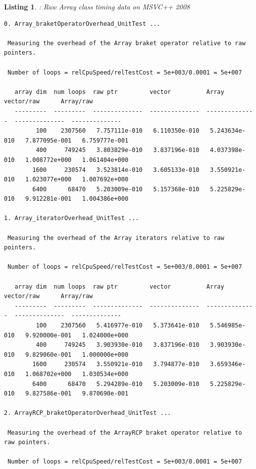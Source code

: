 \documentclass[pdf,ps2pdf,11pt]{SANDreport}
\newtheorem{listing}{Listing}
\begin{document}
\begin{listing}: Raw Array class timing data on MSVC++ 2008  \\
\label{listing:Array-MSVC-Timings}
{\scriptsize\begin{verbatim}
0. Array_braketOperatorOverhead_UnitTest ... 
 
 Measuring the overhead of the Array braket operator relative to raw pointers.
 
 Number of loops = relCpuSpeed/relTestCost = 5e+003/0.0001 = 5e+007
 
   array dim  num loops  raw ptr         vector          Array           vector/raw      Array/raw     
   ---------  ---------  --------------  --------------  --------------  --------------  --------------
         100    2307560   7.757111e-010   6.110350e-010   5.243634e-010   7.877095e-001   6.759777e-001
         400     749245   3.803829e-010   3.837196e-010   4.037398e-010   1.008772e+000   1.061404e+000
        1600     230574   3.523814e-010   3.605133e-010   3.550921e-010   1.023077e+000   1.007692e+000
        6400      68470   5.203009e-010   5.157368e-010   5.225829e-010   9.912281e-001   1.004386e+000

1. Array_iteratorOverhead_UnitTest ... 
 
 Measuring the overhead of the Array iterators relative to raw pointers.
 
 Number of loops = relCpuSpeed/relTestCost = 5e+003/0.0001 = 5e+007
 
   array dim  num loops  raw ptr         vector          Array           vector/raw      Array/raw     
   ---------  ---------  --------------  --------------  --------------  --------------  --------------
         100    2307560   5.416977e-010   5.373641e-010   5.546985e-010   9.920000e-001   1.024000e+000
         400     749245   3.903930e-010   3.837196e-010   3.903930e-010   9.829060e-001   1.000000e+000
        1600     230574   3.550921e-010   3.794877e-010   3.659346e-010   1.068702e+000   1.030534e+000
        6400      68470   5.294289e-010   5.203009e-010   5.225829e-010   9.827586e-001   9.870690e-001

2. ArrayRCP_braketOperatorOverhead_UnitTest ... 
 
 Measuring the overhead of the ArrayRCP braket operator relative to raw pointers.
 
 Number of loops = relCpuSpeed/relTestCost = 5e+003/0.0001 = 5e+007
 

\end{verbatim}}
\end{listing}
\end{document}
